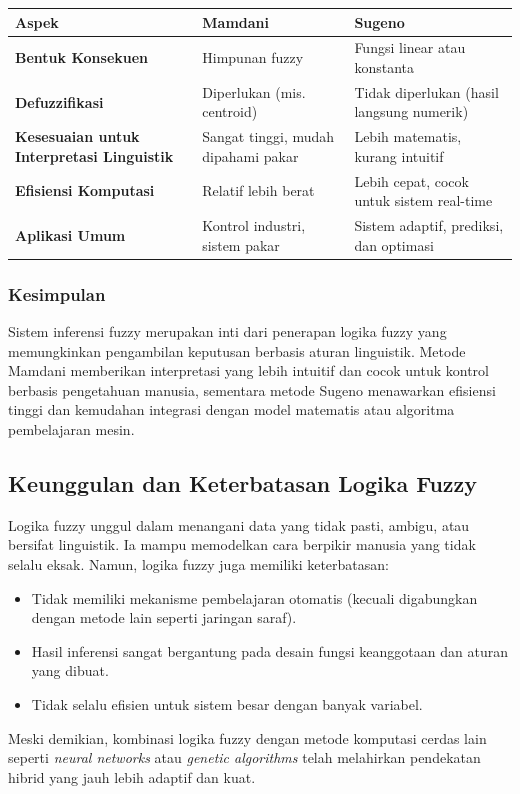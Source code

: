 \documentclass[12pt,a4paper]{article}
\theoremstyle{remark}
\begin{document}
\begin{table}[h!]
    \centering
    \begin{tabular}{|p{3cm}|p{5cm}|p{5cm}|}
        \hline
        \textbf{Aspek}                                    & \textbf{Mamdani}                    & \textbf{Sugeno}                           \\ \hline
        \textbf{Bentuk Konsekuen}                         & Himpunan fuzzy                      & Fungsi linear atau konstanta              \\ \hline
        \textbf{Defuzzifikasi}                            & Diperlukan (mis. centroid)          & Tidak diperlukan (hasil langsung numerik) \\ \hline
        \textbf{Kesesuaian untuk Interpretasi Linguistik} & Sangat tinggi, mudah dipahami pakar & Lebih matematis, kurang intuitif          \\ \hline
        \textbf{Efisiensi Komputasi}                      & Relatif lebih berat                 & Lebih cepat, cocok untuk sistem real-time \\ \hline
        \textbf{Aplikasi Umum}                            & Kontrol industri, sistem pakar      & Sistem adaptif, prediksi, dan optimasi    \\ \hline
    \end{tabular}
\end{table}

\subsubsection{Kesimpulan}
Sistem inferensi fuzzy merupakan inti dari penerapan logika fuzzy yang memungkinkan pengambilan keputusan berbasis aturan linguistik.
Metode Mamdani memberikan interpretasi yang lebih intuitif dan cocok untuk kontrol berbasis pengetahuan manusia, sementara metode Sugeno menawarkan efisiensi tinggi dan kemudahan integrasi dengan model matematis atau algoritma pembelajaran mesin.


\subsection{Keunggulan dan Keterbatasan Logika Fuzzy}
Logika fuzzy unggul dalam menangani data yang tidak pasti, ambigu, atau bersifat linguistik. Ia mampu memodelkan cara berpikir manusia yang tidak selalu eksak.
Namun, logika fuzzy juga memiliki keterbatasan:
\begin{itemize}
    \item Tidak memiliki mekanisme pembelajaran otomatis (kecuali digabungkan dengan metode lain seperti jaringan saraf).
    \item Hasil inferensi sangat bergantung pada desain fungsi keanggotaan dan aturan yang dibuat.
    \item Tidak selalu efisien untuk sistem besar dengan banyak variabel.
\end{itemize}
Meski demikian, kombinasi logika fuzzy dengan metode komputasi cerdas lain seperti \textit{neural networks} atau \textit{genetic algorithms} telah melahirkan pendekatan hibrid yang jauh lebih adaptif dan kuat.
\end{document}
